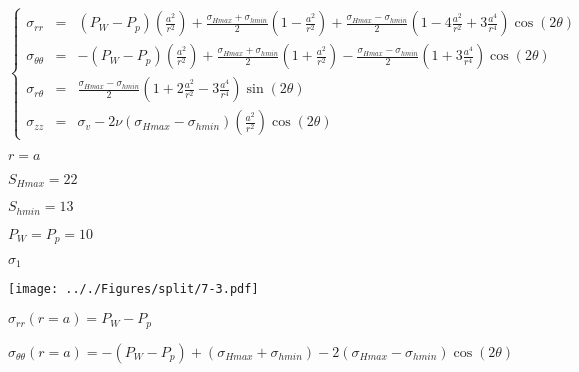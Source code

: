 \documentclass[onecolumn,11pt]{report}
\def\lthtmlcheckvsize{\ifdim\ht\sizebox<\vsize 
  \ifdim\wd\sizebox<\hsize\expandafter\hfill\fi \expandafter\vfill
  \else\expandafter\vss\fi}%
\begin{document}
{\newpage\clearpage
{}%
\begin{displaymath}\left\lbrace
\begin{array}{rcl}
\sigma_{rr} & = &
(P_W - P_p) \left( \frac{a^2}{r^2} \right) +
\frac{\sigma_{Hmax}+\sigma_{hmin}}{2} \left( 1 -\frac{a^2}{r^2} \right) +
\frac{\sigma_{Hmax}-\sigma_{hmin}}{2} \left( 1 -4 \frac{a^2}{r^2} +3 \frac{a^4}{r^4} \right) \cos (2\theta) \\
\sigma_{\theta \theta} & = &
-(P_W - P_p) \left( \frac{a^2}{r^2} \right)
+\frac{\sigma_{Hmax}+\sigma_{hmin}}{2} \left( 1 +\frac{a^2}{r^2} \right) -
\frac{\sigma_{Hmax}-\sigma_{hmin}}{2} \left( 1 +3 \frac{a^4}{r^4} \right) \cos (2\theta) \\
\sigma_{r \theta} & = &
\frac{\sigma_{Hmax}-\sigma_{hmin}}{2} \left( 1 +2 \frac{a^2}{r^2} -3 \frac{a^4}{r^4} \right) \sin (2\theta) \\
\sigma_{zz} & = & \sigma_v - 2 \nu \left( \sigma_{Hmax}-\sigma_{hmin} \right) \left( \frac{a^2}{r^2} \right) \cos (2\theta)
\end{array}
\right.\end{displaymath}%
\lthtmldisplayZ
\lthtmlcheckvsize\clearpage}

{\newpage\clearpage
{}%
$ r=a$%
\lthtmlindisplaymathZ
\lthtmlcheckvsize\clearpage}

{\newpage\clearpage
{}%
$ S_{Hmax}=22$%
\lthtmlindisplaymathZ
\lthtmlcheckvsize\clearpage}

{\newpage\clearpage
{}%
$ S_{hmin}=13$%
\lthtmlindisplaymathZ
\lthtmlcheckvsize\clearpage}

{\newpage\clearpage
{}%
$ P_W=P_p=10$%
\lthtmlindisplaymathZ
\lthtmlcheckvsize\clearpage}

{\newpage\clearpage
{}%
$ \sigma_{1}$%
\lthtmlindisplaymathZ
\lthtmlcheckvsize\clearpage}

{\newpage\clearpage
{}%
\texttt{[image: .././Figures/split/7-3.pdf]}%
\lthtmlpictureZ
\lthtmlcheckvsize\clearpage}

{\newpage\clearpage
{}%
$\displaystyle \sigma_{rr}(r=a) = P_W - P_p$%
\lthtmlindisplaymathZ
\lthtmlcheckvsize\clearpage}

{\newpage\clearpage
{}%
$\displaystyle \sigma_{\theta \theta} (r=a) =
-(P_W - P_p) +(\sigma_{Hmax}+\sigma_{hmin})
-2(\sigma_{Hmax}-\sigma_{hmin}) \cos (2\theta)$%
\lthtmlindisplaymathZ
\lthtmlcheckvsize\clearpage}
\end{document}
